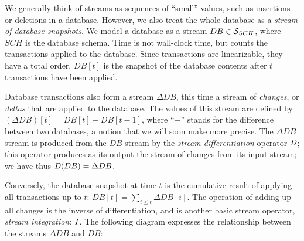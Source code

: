 \begin{center}
\vspace{-.2cm}
\end{center}

We generally think of streams as sequences of ``small'' values,
such as insertions or deletions in a database.
However, we also treat the whole database as a \emph{stream of database
snapshots}.  We model a database as a
stream $DB \in \mathcal{S}_{SCH}$, where $SCH$ is the database schema.
Time is not wall-clock time, but counts
the transactions applied to the database.
Since transactions are linearizable, they have a total order.
$DB[t]$ is the snapshot of the
database contents after $t$ transactions have been applied.

Database transactions also form a stream $\Delta DB$, this time a stream of \emph{changes},
or \emph{deltas} that are applied to the database.  The values of
this stream are defined by $(\Delta DB)[t] = DB[t] - DB[t-1]$, where ``$-$'' stands
for the difference between two databases, a notion that we will soon make more precise.
The $\Delta DB$ stream is produced from the $DB$ stream by
the \emph{stream differentiation} operator $\mathit{D}$;
this operator produces as its output the stream of changes from its input stream;
we have thus $\mathit{D}(DB) = \Delta DB$.

Conversely, the database snapshot at time $t$ is the cumulative result of applying all
transactions up to $t$: $DB[t] = \sum_{i \leq t} \Delta DB[i]$.
The operation of adding up all changes is the inverse of differentiation,
and is another basic stream operator, \emph{stream integration}: $\mathit{I}$.
The following diagram expresses the relationship between the streams $\Delta DB$ and $DB$:

\begin{center}
\end{center}

